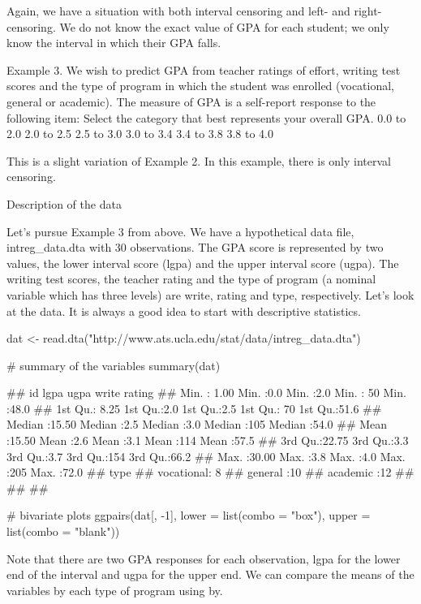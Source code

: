  Again, we have a situation with both interval censoring and left- and right-censoring. We do not know the exact value of GPA for each student; we only know the interval in which their GPA falls.

Example 3. We wish to predict GPA from teacher ratings of effort, writing test scores and the type of program in which the student was enrolled (vocational, general or academic). The measure of GPA is a self-report response to the following item:
 Select the category that best represents your overall GPA.
  0.0 to 2.0
  2.0 to 2.5
  2.5 to 3.0
  3.0 to 3.4
  3.4 to 3.8
  3.8 to 4.0
 
This is a slight variation of Example 2. In this example, there is only interval censoring.

Description of the data

Let's pursue Example 3 from above. We have a hypothetical data file, intreg_data.dta with 30 observations. The GPA score is represented by two values, the lower interval score (lgpa) and the upper interval score (ugpa). The writing test scores, the teacher rating and the type of program (a nominal variable which has three levels) are write, rating and type, respectively. Let's look at the data. It is always a good idea to start with descriptive statistics.
 


dat <- read.dta("http://www.ats.ucla.edu/stat/data/intreg_data.dta")

# summary of the variables
summary(dat)

##        id             lgpa          ugpa         write         rating    
##  Min.   : 1.00   Min.   :0.0   Min.   :2.0   Min.   : 50   Min.   :48.0  
##  1st Qu.: 8.25   1st Qu.:2.0   1st Qu.:2.5   1st Qu.: 70   1st Qu.:51.6  
##  Median :15.50   Median :2.5   Median :3.0   Median :105   Median :54.0  
##  Mean   :15.50   Mean   :2.6   Mean   :3.1   Mean   :114   Mean   :57.5  
##  3rd Qu.:22.75   3rd Qu.:3.3   3rd Qu.:3.7   3rd Qu.:154   3rd Qu.:66.2  
##  Max.   :30.00   Max.   :3.8   Max.   :4.0   Max.   :205   Max.   :72.0  
##          type   
##  vocational: 8  
##  general   :10  
##  academic  :12  
##                 
##                 
## 

# bivariate plots
ggpairs(dat[, -1], lower = list(combo = "box"), upper = list(combo = "blank"))



 Note that there are two GPA responses for each observation, lgpa for the lower end of the interval and ugpa for the upper end. We can compare the means of the variables by each type of program using by.
 


